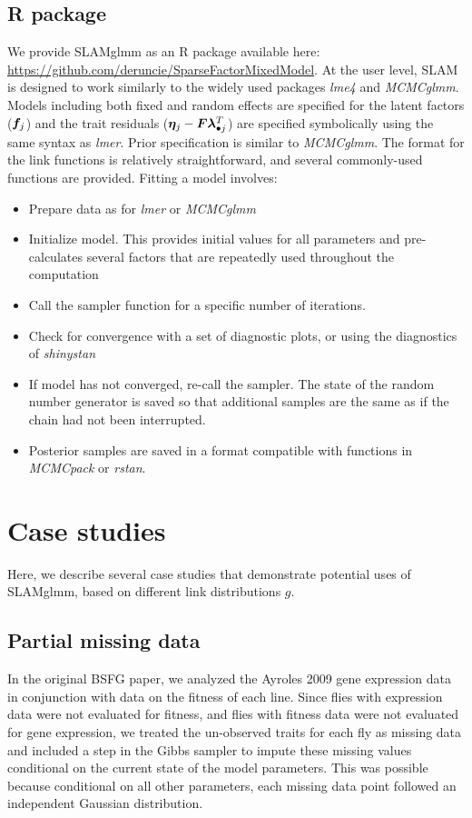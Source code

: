 \documentclass[11pt]{amsart}
\newcommand*{\B}[1]{\ifmmode\bm{#1}\else\textbf{#1}\fi}
\begin{document}
\subsection{R package}
We provide SLAMglmm as an R package available here:  \url{https://github.com/deruncie/SparseFactorMixedModel}. At the user level, SLAM is designed to work similarly to the widely used packages \emph{lme4} and \emph{MCMCglmm}. Models including both fixed and random effects are specified for the latent factors ($\B{f}_j$) and the trait residuals ($\B{\eta}_j - \B{F}\B{\lambda}_{\bullet j}^T$) are specified symbolically using the same syntax as \emph{lmer}. Prior specification is similar to \emph{MCMCglmm}. The format for the link functions is relatively straightforward, and several commonly-used functions are provided. Fitting a model involves:
\begin{itemize}
\item Prepare data as for \emph{lmer} or \emph{MCMCglmm}
\item Initialize model. This provides initial values for all parameters and pre-calculates several factors that are repeatedly used throughout the computation
\item Call the sampler function for a specific number of iterations.
\item Check for convergence with a set of diagnostic plots, or using the diagnostics of \emph{shinystan}
\item If model has not converged, re-call the sampler. The state of the random number generator is saved so that additional samples are the same as if the chain had not been interrupted.
\item Posterior samples are saved in a format compatible with functions in \emph{MCMCpack} or \emph{rstan}.
\end{itemize}


\section{Case studies}
\label{link_functions}
Here, we describe several case studies that demonstrate potential uses of SLAMglmm, based on different link distributions $g$.

\subsection{Partial missing data}
In the original BSFG paper, we analyzed the Ayroles 2009 gene expression data in conjunction with data on the fitness of each line. Since flies with expression data were not evaluated for fitness, and flies with fitness data were not evaluated for gene expression, we treated the un-observed traits for each fly as missing data and included a step in the Gibbs sampler to impute these missing values conditional on the current state of the model parameters. This was possible because conditional on all other parameters, each missing data point followed an independent Gaussian distribution.
\end{document}
